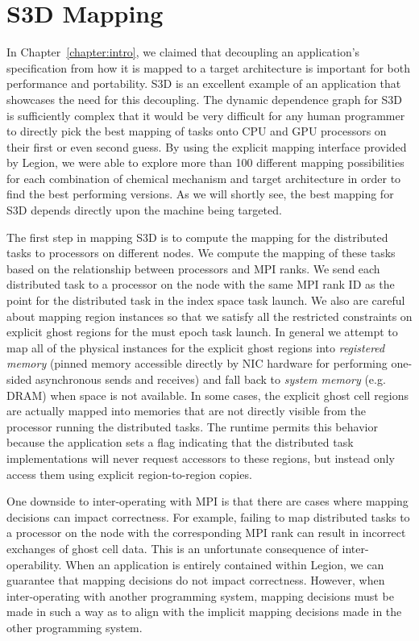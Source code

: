 \section{S3D Mapping}
\label{sec:s3dmap}
In Chapter~\ref{chapter:intro}, we claimed that decoupling
an application's specification from how it is mapped to
a target architecture is important for both performance
and portability. S3D is an excellent example of an 
application that showcases the need for this decoupling.
The dynamic dependence graph for S3D is sufficiently
complex that it would be very difficult for any human
programmer to directly pick the best mapping of tasks
onto CPU and GPU processors on their first or even
second guess. By using the explicit mapping interface
provided by Legion, we were able to explore more than 
100 different mapping possibilities for each combination
of chemical mechanism and target architecture in order to 
find the best performing versions. As we will shortly
see, the best mapping for S3D depends directly upon the 
machine being targeted.

The first step in mapping S3D is to compute the mapping 
for the distributed tasks to processors on different 
nodes. We compute the mapping of these tasks based on
the relationship between processors and MPI ranks. We
send each distributed task to a processor on the node
with the same MPI rank ID as the point for the distributed
task in the index space task launch. We also 
are careful about mapping region instances so that we
satisfy all the restricted constraints on explicit
ghost regions for the must epoch task launch. In general
we attempt to map all of the physical instances for 
the explicit ghost regions into {\em registered memory}
(pinned memory accessible directly by NIC hardware for
performing one-sided asynchronous sends and receives)
and fall back to {\em system memory} (e.g. DRAM) when
space is not available. In some cases, the explicit
ghost cell regions are actually mapped into memories
that are not directly visible from the processor
running the distributed tasks. The runtime permits
this behavior because the application sets a flag
indicating that the distributed task implementations
will never request accessors to these regions, but
instead only access them using explicit 
region-to-region copies.

One downside to inter-operating with MPI is that
there are cases where mapping decisions can impact
correctness. For example, failing to map distributed 
tasks to a processor on the node with the corresponding
MPI rank can result in incorrect exchanges of ghost
cell data. This is an unfortunate consequence of 
inter-operability. When an application is entirely
contained within Legion, we can guarantee that mapping
decisions do not impact correctness. However, when
inter-operating with another programming system,
mapping decisions must be made in such a way as to
align with the implicit mapping decisions made in the
other programming system.

